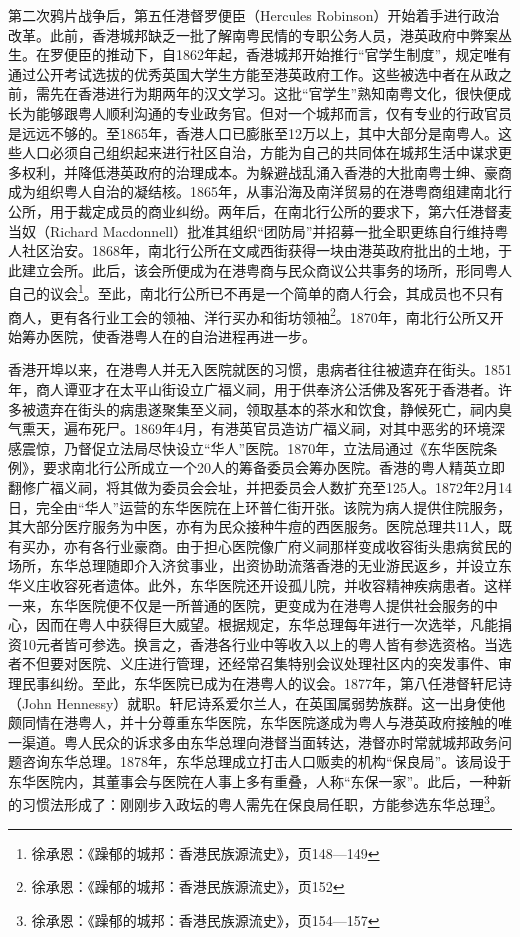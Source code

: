 第二次鸦片战争后，第五任港督罗便臣（Hercules Robinson）开始着手进行政治改革。此前，香港城邦缺乏一批了解南粤民情的专职公务人员，港英政府中弊案丛生。在罗便臣的推动下，自1862年起，香港城邦开始推行“官学生制度”，规定唯有通过公开考试选拔的优秀英国大学生方能至港英政府工作。这些被选中者在从政之前，需先在香港进行为期两年的汉文学习。这批“官学生”熟知南粤文化，很快便成长为能够跟粤人顺利沟通的专业政务官。但对一个城邦而言，仅有专业的行政官员是远远不够的。至1865年，香港人口已膨胀至12万以上，其中大部分是南粤人。这些人口必须自己组织起来进行社区自治，方能为自己的共同体在城邦生活中谋求更多权利，并降低港英政府的治理成本。为躲避战乱涌入香港的大批南粤士绅、豪商成为组织粤人自治的凝结核。1865年，从事沿海及南洋贸易的在港粤商组建南北行公所，用于裁定成员的商业纠纷。两年后，在南北行公所的要求下，第六任港督麦当奴（Richard Macdonnell）批准其组织“团防局”并招募一批全职更练自行维持粤人社区治安。1868年，南北行公所在文咸西街获得一块由港英政府批出的土地，于此建立会所。此后，该会所便成为在港粤商与民众商议公共事务的场所，形同粤人自己的议会\footnote{徐承恩：《躁郁的城邦：香港民族源流史》，页148—149}。至此，南北行公所已不再是一个简单的商人行会，其成员也不只有商人，更有各行业工会的领袖、洋行买办和街坊领袖\footnote{徐承恩：《躁郁的城邦：香港民族源流史》，页152}。1870年，南北行公所又开始筹办医院，使香港粤人在的自治进程再进一步。

香港开埠以来，在港粤人并无入医院就医的习惯，患病者往往被遗弃在街头。1851年，商人谭亚才在太平山街设立广福义祠，用于供奉济公活佛及客死于香港者。许多被遗弃在街头的病患遂聚集至义祠，领取基本的茶水和饮食，静候死亡，祠内臭气熏天，遍布死尸。1869年4月，有港英官员造访广福义祠，对其中恶劣的环境深感震惊，乃督促立法局尽快设立“华人”医院。1870年，立法局通过《东华医院条例》，要求南北行公所成立一个20人的筹备委员会筹办医院。香港的粤人精英立即翻修广福义祠，将其做为委员会会址，并把委员会人数扩充至125人。1872年2月14日，完全由“华人”运营的东华医院在上环普仁街开张。该院为病人提供住院服务，其大部分医疗服务为中医，亦有为民众接种牛痘的西医服务。医院总理共11人，既有买办，亦有各行业豪商。由于担心医院像广府义祠那样变成收容街头患病贫民的场所，东华总理随即介入济贫事业，出资协助流落香港的无业游民返乡，并设立东华义庄收容死者遗体。此外，东华医院还开设孤儿院，并收容精神疾病患者。这样一来，东华医院便不仅是一所普通的医院，更变成为在港粤人提供社会服务的中心，因而在粤人中获得巨大威望。根据规定，东华总理每年进行一次选举，凡能捐资10元者皆可参选。换言之，香港各行业中等收入以上的粤人皆有参选资格。当选者不但要对医院、义庄进行管理，还经常召集特别会议处理社区内的突发事件、审理民事纠纷。至此，东华医院已成为在港粤人的议会。1877年，第八任港督轩尼诗（John Hennessy）就职。轩尼诗系爱尔兰人，在英国属弱势族群。这一出身使他颇同情在港粤人，并十分尊重东华医院，东华医院遂成为粤人与港英政府接触的唯一渠道。粤人民众的诉求多由东华总理向港督当面转达，港督亦时常就城邦政务问题咨询东华总理。1878年，东华总理成立打击人口贩卖的机构“保良局”。该局设于东华医院内，其董事会与医院在人事上多有重叠，人称“东保一家”。此后，一种新的习惯法形成了：刚刚步入政坛的粤人需先在保良局任职，方能参选东华总理\footnote{徐承恩：《躁郁的城邦：香港民族源流史》，页154—157}。

